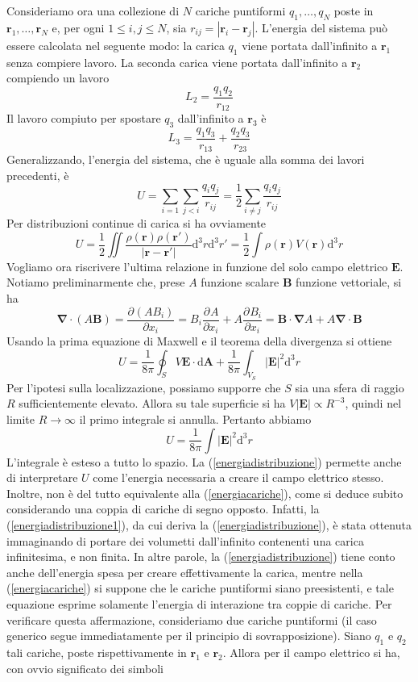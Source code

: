 \documentclass[a4paper,11pt]{book}
\newcommand{\dif}{\mathrm{d}}
\newcommand{\der}[3][]{\frac{\partial ^{#1}#2}{\partial {#3}^{#1}}}
\let\oldnabla\nabla
\renewcommand{\nabla}{\vec{\oldnabla}}
\renewcommand{\vec}[1]{\mathbf{#1}}
\theoremstyle{theorem}
\theoremstyle{definition}
\begin{document}
Consideriamo ora una collezione di $N$ cariche puntiformi $q_1,\dots,q_N$ poste in $\vec{r}_1,\dots,\vec{r}_N$ e, per ogni $1\leq i,j\leq N$, sia $r_{ij}=|\vec{r}_i-\vec{r}_j|$. L'energia del sistema può essere calcolata nel seguente modo: la carica $q_1$ viene portata dall'infinito a $\vec{r}_1$ senza compiere lavoro. La seconda carica viene portata dall'infinito a $\vec{r}_2$ compiendo un lavoro
\[L_2=\frac{q_1q_2}{r_{12}}\]
Il lavoro compiuto per spostare $q_3$ dall'infinito a $\vec{r}_3$ è
\[L_3=\frac{q_1q_3}{r_{13}}+\frac{q_2q_3}{r_{23}}\]
Generalizzando, l'energia del sistema, che è uguale alla somma dei lavori precedenti, è
\begin{equation}\label{energiacariche}U=\sum_{i=1}\sum_{j<i}\frac{q_{i}q_j}{r_{ij}}=\frac{1}{2}\sum_{i\neq j}\frac{q_iq_j}{r_{ij}}\end{equation}
Per distribuzioni continue di carica si ha ovviamente
\begin{equation}
\label{energiadistribuzione1}U=\frac{1}{2}\iint\frac{\rho(\vec{r})\rho(\vec{r}')}{|\vec{r}-\vec{r}'|}\dif^3r\dif^3r'=\frac{1}{2}\int\rho(\vec{r})V(\vec{r})\dif^3r\end{equation}
Vogliamo ora riscrivere l'ultima relazione in funzione del solo campo elettrico $\vec{E}$. Notiamo preliminarmente che, prese $A$ funzione scalare $\vec{B}$ funzione vettoriale, si ha
\[
	\nabla\cdot(A\vec{B})=\der{(AB_i)}{x_i}=B_i\der{A}{x_i}+A\der{B_i}{x_i}=\vec{B}\cdot\nabla A+A\nabla\cdot\vec{B}
\]
Usando la prima equazione di Maxwell e il teorema della divergenza si ottiene
\[
	U=\frac{1}{8\pi}\oint_S V\vec{E}\cdot\dif\vec{A}+\frac{1}{8\pi}\int_{V_S}|\vec{E}|^2\dif^3r
\]
Per l'ipotesi sulla localizzazione, possiamo supporre che $S$ sia una sfera di raggio $R$ sufficientemente elevato. Allora su tale superficie si ha $V|\vec{E}|\propto R^{-3}$, quindi nel limite $R\to\infty$ il primo integrale si annulla. Pertanto abbiamo
\begin{equation}
	\label{energiadistribuzione}
	U=\frac{1}{8\pi}\int|\vec{E}|^2\dif^3r
\end{equation}
L'integrale è esteso a tutto lo spazio. La (\ref{energiadistribuzione}) permette anche di interpretare $U$ come l'energia necessaria a creare il campo elettrico stesso. Inoltre, non è del tutto equivalente alla (\ref{energiacariche}), come si deduce subito considerando una coppia di cariche di segno opposto. Infatti, la (\ref{energiadistribuzione1}), da cui deriva la (\ref{energiadistribuzione}), è stata ottenuta immaginando di portare dei volumetti dall'infinito contenenti una carica infinitesima, e non finita. In altre parole, la (\ref{energiadistribuzione}) tiene conto anche dell'energia spesa per creare effettivamente la carica, mentre nella (\ref{energiacariche}) si suppone che le cariche puntiformi siano preesistenti, e tale equazione esprime solamente l'energia di interazione tra coppie di cariche. Per verificare questa affermazione, consideriamo due cariche puntiformi (il caso generico segue immediatamente per il principio di sovrapposizione). Siano $q_1$ e $q_2$ tali cariche, poste rispettivamente in $\vec{r}_1$ e $\vec{r}_2$. Allora per il campo elettrico si ha, con ovvio significato dei simboli
\end{document}
